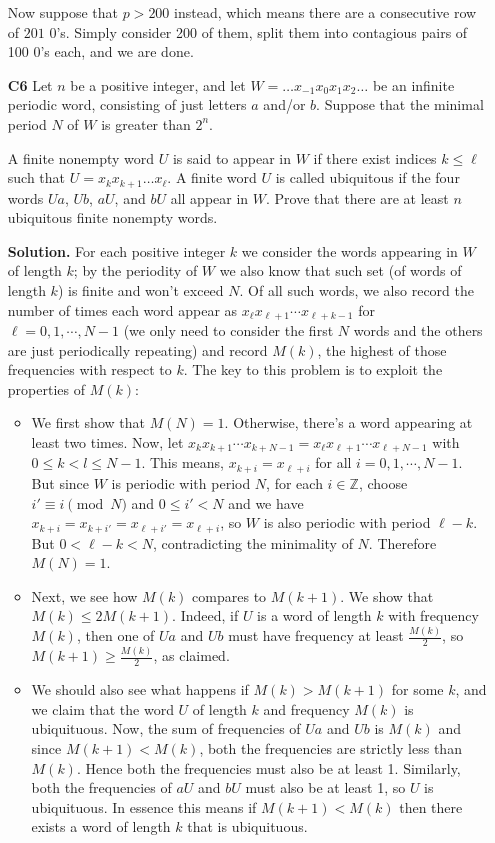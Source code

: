 \documentclass[11pt,a4paper]{article}
\begin{document}
\begin{enumerate}
	Now suppose that $p>200$ instead, which means there are a consecutive row of $201$ 0's. Simply consider 200 of them, split them into contagious pairs of 100 0's each, and we are done. 
	
	\item[\textbf{C6}] Let $n$ be a positive integer, and let $W = \ldots x_{-1}x_0x_1x_2 \ldots$ be an infinite periodic word, consisting of just letters $a$ and/or $b$. Suppose that the minimal period $N$ of $W$ is greater than $2^n$.
	
	A finite nonempty word $U$ is said to appear in $W$ if there exist indices $k \leq \ell$ such that $U=x_k x_{k+1} \ldots x_{\ell}$. A finite word $U$ is called ubiquitous if the four words $Ua$, $Ub$, $aU$, and $bU$ all appear in $W$. Prove that there are at least $n$ ubiquitous finite nonempty words.
	
	\textbf{Solution.} For each positive integer $k$ we consider the words appearing in $W$ of length $k$; by the periodity of $W$ we also know that such set (of words of length $k$) is finite and won't exceed $N$. Of all such words, we also record the number of times each word appear as $x_{\ell}x_{\ell+1}\cdots x_{\ell+k-1}$ for $\ell=0, 1, \cdots , N-1$ (we only need to consider the first $N$ words and the others are just periodically repeating) and record $M(k)$, the highest of those frequencies with respect to $k$. The key to this problem is to exploit the properties of $M(k)$: 
	\begin{itemize}
		\item We first show that $M(N)=1$. Otherwise, there's a word appearing at least two times. Now, let $x_{k}x_{k+1}\cdots x_{k+N-1}=x_{\ell}x_{\ell+1}\cdots x_{\ell+N-1}$ with $0\le k<l\le N-1$. 
		This means, $x_{k+i}=x_{\ell+i}$ for all $i=0, 1, \cdots , N-1$. But since $W$ is periodic with period $N$, for each $i\in\mathbb{Z}$, choose $i'\equiv i\pmod{N}$ and $0\le i'<N$ and we have 
		$x_{k+i}=x_{k+i'}=x_{\ell+i'}=x_{\ell+i}$, so $W$ is also periodic with period $\ell-k$. But $0<\ell-k<N$, contradicting the minimality of $N$. Therefore $M(N)=1$. 
		
		\item Next, we see how $M(k)$ compares to $M(k+1)$. We show that $M(k)\le 2M(k+1)$. Indeed, if $U$ is a word of length $k$ with frequency $M(k)$, then one of $Ua$ and $Ub$ must have frequency at least $\frac{M(k)}{2}$, so $M(k+1)\ge \frac{M(k)}{2}$, as claimed. 
		
		\item We should also see what happens if $M(k)>M(k+1)$ for some $k$, and we claim that the word $U$ of length $k$ and frequency $M(k)$ is ubiquituous. Now, the sum of frequencies of $Ua$ and $Ub$ is $M(k)$ and since $M(k+1)<M(k)$, both the frequencies are strictly less than $M(k)$. 
		Hence both the frequencies must also be at least 1. Similarly, both the frequencies of $aU$ and $bU$ must also be at least 1, so $U$ is ubiquituous. In essence this means if $M(k+1)<M(k)$ then there exists a word of length $k$ that is ubiquituous. 
		

\end{itemize}
\end{enumerate}
\end{document}
